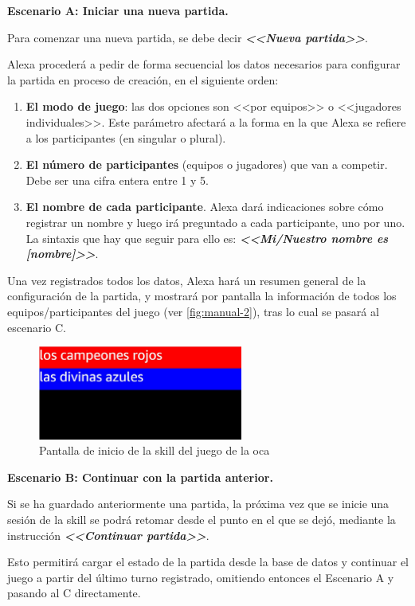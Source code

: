 \textbf{Escenario A: Iniciar una nueva partida.}

Para comenzar una nueva partida, se debe decir \textbf{\textit{<<Nueva partida>>}}.

Alexa procederá a pedir de forma secuencial los datos necesarios para configurar la partida en proceso de creación, en el siguiente orden:
\begin{enumerate}
	\item \textbf{El modo de juego}: las dos opciones son <<por equipos>> o <<jugadores individuales>>. Este parámetro afectará a la forma en la que Alexa se refiere a los participantes (en singular o plural).
	\item \textbf{El número de participantes} (equipos o jugadores) que van a competir. Debe ser una cifra entera entre 1 y 5.
	\item \textbf{El nombre de cada participante}. Alexa dará indicaciones sobre cómo registrar un nombre y luego irá preguntado a cada participante, uno por uno. La sintaxis que hay que seguir para ello es: \textbf{\textit{<<Mi/Nuestro nombre es [nombre]>>}}.
\end{enumerate}

Una vez registrados todos los datos, Alexa hará un resumen general de la configuración de la partida, y mostrará por pantalla la información de todos los equipos/participantes del juego (ver \autoref{fig:manual-2}), tras lo cual se pasará al escenario C.

\begin{figure}[H]
	\centering
	\includegraphics[width=0.6\textwidth]{imgs/interfaz-2.JPG}
	\caption{Pantalla de inicio de la skill del juego de la oca}
	\label{fig:manual-2}
\end{figure}

\textbf{Escenario B: Continuar con la partida anterior.}

Si se ha guardado anteriormente una partida, la próxima vez que se inicie una sesión de la skill se podrá retomar desde el punto en el que se dejó, mediante la instrucción \textbf{\textit{<<Continuar partida>>}}.

Esto permitirá cargar el estado de la partida desde la base de datos y continuar el juego a partir del último turno registrado, omitiendo entonces el Escenario A y pasando al C directamente.

